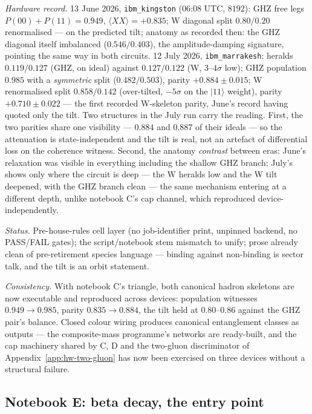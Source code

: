 \emph{Hardware record.} 13 June 2026, \texttt{ibm\_kingston} (06:08 UTC, $8192$): GHZ free legs
$P(00){+}P(11) = 0.949$, $\langle XX\rangle = +0.835$; W diagonal split $0.80/0.20$ renormalised
--- on the predicted tilt; anatomy as recorded then: the GHZ diagonal itself imbalanced
($0.546/0.403$), the amplitude-damping signature, pointing the same way in both circuits.
12 July 2026, \texttt{ibm\_marrakesh}: heralds $0.119/0.127$ (GHZ, on ideal) against
$0.127/0.122$ (W, $3$--$4\sigma$ low); GHZ population $0.985$ with a \emph{symmetric} split
($0.482/0.503$), parity $+0.884 \pm 0.015$; W renormalised split $0.858/0.142$
(over-tilted, $-5\sigma$ on the $\lvert11\rangle$ weight), parity $+0.710 \pm 0.022$ --- the
first recorded W-skeleton parity, June's record having quoted only the tilt. Two structures in
the July run carry the reading. First, the two parities share one visibility --- $0.884$ and
$0.887$ of their ideals --- so the attenuation is state-independent and the tilt is real, not an
artefact of differential loss on the coherence witness. Second, the anatomy \emph{contrast}
between eras: June's relaxation was visible in everything including the shallow GHZ branch;
July's shows only where the circuit is deep --- the W heralds low and the W tilt deepened, with
the GHZ branch clean --- the same mechanism entering at a different depth, unlike notebook C's
cap channel, which reproduced device-independently.

\emph{Status.} Pre-house-rules cell layer (no job-identifier print, unpinned backend, no
PASS/FAIL gates); the script/notebook stem mismatch to unify; prose already clean of
pre-retirement species language --- binding against non-binding is sector talk, and the tilt is
an orbit statement.

\emph{Consistency.} With notebook C's triangle, both canonical hadron skeletons are now
executable and reproduced across devices: population witnesses $0.949 \to 0.985$, parity
$0.835 \to 0.884$, the tilt held at $0.80$--$0.86$ against the GHZ pair's balance. Closed colour
wiring produces canonical entanglement classes as outputs --- the composite-mass programme's
networks are ready-built, and the cap machinery shared by C, D and the two-gluon discriminator of
Appendix~\ref{app:hw-two-gluon} has now been exercised on three devices without a structural
failure.

\subsection{Notebook E: beta decay, the entry point}
\label{app:nb-E}

